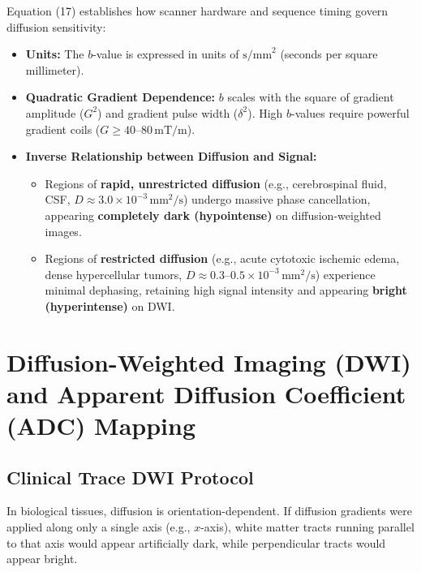 \documentclass[11pt,a4paper]{article}
\begin{document}
\begin{physicsbox}
Equation (17) establishes how scanner hardware and sequence timing govern diffusion sensitivity:
\begin{itemize}[leftmargin=*]
    \item \textbf{Units:} The $b$-value is expressed in units of \textbf{$\text{s/mm}^2$} (seconds per square millimeter).
    \item \textbf{Quadratic Gradient Dependence:} $b$ scales with the square of gradient amplitude ($G^2$) and gradient pulse width ($\delta^2$). High $b$-values require powerful gradient coils ($G \ge 40\text{--}80\,\text{mT/m}$).
    \item \textbf{Inverse Relationship between Diffusion and Signal:}
    \begin{itemize}
        \item Regions of \textbf{rapid, unrestricted diffusion} (e.g., cerebrospinal fluid, CSF, $D \approx 3.0 \times 10^{-3}\,\text{mm}^2/\text{s}$) undergo massive phase cancellation, appearing \textbf{completely dark (hypointense)} on diffusion-weighted images.
        \item Regions of \textbf{restricted diffusion} (e.g., acute cytotoxic ischemic edema, dense hypercellular tumors, $D \approx 0.3\text{--}0.5 \times 10^{-3}\,\text{mm}^2/\text{s}$) experience minimal dephasing, retaining high signal intensity and appearing \textbf{bright (hyperintense)} on DWI.
    \end{itemize}
\end{itemize}
\end{physicsbox}

\newpage
\section[Diffusion-Weighted Imaging (DWI) and ADC Mapping]{Diffusion-Weighted Imaging (DWI) and Apparent Diffusion Coefficient (ADC) Mapping}

\subsection{Clinical Trace DWI Protocol}

In biological tissues, diffusion is orientation-dependent. If diffusion gradients were applied along only a single axis (e.g., $x$-axis), white matter tracts running parallel to that axis would appear artificially dark, while perpendicular tracts would appear bright.
\end{document}
